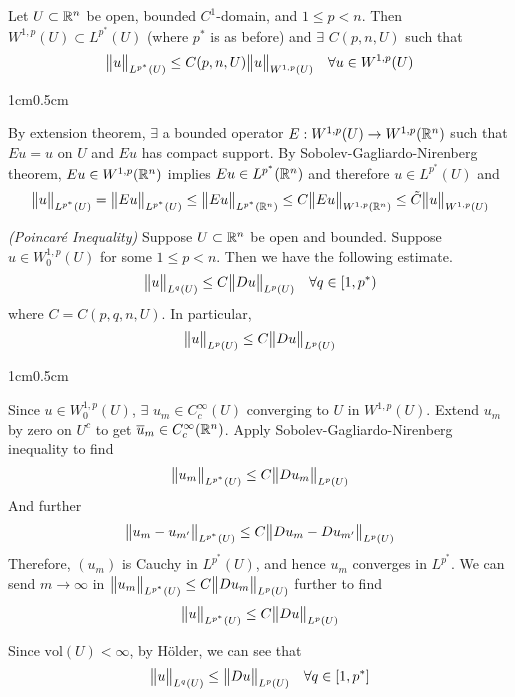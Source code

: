 \documentclass[12pt,a4paper]{report}
\newenvironment{proof}
{\begin{changemargin}{1cm}{0.5cm} 
	}%
	{\end{changemargin}
}
\begin{document}
 Let $U \subset \mathbb{R}^n$ be open, bounded $C^1$-domain, and $1\leq p<n$. Then $W^{1,p}(U) \subset L^{p^*}(U)$ (where $p^*$ is as before) and $\exists$ $C(p,n,U)$ such that
\begin{align*}
\bigl\lVert u\bigr\rVert_{L^{p^*}(U)} \leq C(p,n,U) \bigl\lVert u\bigr\rVert_{W^{1,p} (U)} \quad \forall u \in W^{1,p}(U)
\end{align*} 
\begin{proof}
\pf By extension theorem, $\exists$ a bounded operator $E: W^{1,p}(U) \rightarrow W^{1,p}(\mathbb{R}^n)$ such that $Eu = u$ on $U$ and $Eu$ has compact support. By Sobolev-Gagliardo-Nirenberg theorem, $Eu \in W^{1,p}(\mathbb{R}^n)$ implies $Eu \in L^{p^*} (\mathbb{R}^n)$ and therefore $u \in L^{p^*}(U)$ and
\begin{align*}
\bigl\lVert u\bigr\rVert_{L^{p^*}(U)} = \bigl\lVert Eu\bigr\rVert_{L^{p^*}(U)} \leq \bigl\lVert Eu\bigr\rVert_{L^{p^*}(\mathbb{R}^n)} \leq C \bigl\lVert Eu\bigr\rVert_{W^{1,p}(\mathbb{R}^n)} \leq \tilde{C}\bigl\lVert u\bigr\rVert_{W^{1,p}(U)}
\end{align*}

\eop
\end{proof}
\s

 \emph{(Poincar\'{e} Inequality)} Suppose $U\subset \mathbb{R}^n$ be open and bounded. Suppose $u \in W_0^{1,p}(U)$ for some $1\leq p<n$. Then we have the following estimate.
\begin{align*}
\bigl\lVert u\bigr\rVert_{L^q (U)} \leq C\bigl\lVert Du\bigr\rVert_{L^p(U)} \quad \forall q \in [1,p^*)
\end{align*}
where $C = C(p,q,n,U)$. In particular,
\begin{align*}
\bigl\lVert u\bigr\rVert_{L^{p}(U)} \leq C \bigl\lVert Du\bigr\rVert_{L^p(U)}
\end{align*}
\begin{proof}
\pf Since $u \in W^{1,p}_0(U)$, $\exists$ $u_m \in C_c^{\infty}(U)$ converging to $U$ in $W^{1,p}(U)$. Extend $u_m$ by zero on $U^c$ to get $\overline{u}_m \in C^{\infty}_c (\mathbb{R}^n)$. Apply Sobolev-Gagliardo-Nirenberg inequality to find
\begin{align*}
\bigl\lVert u_m\bigr\rVert_{L^{p^*}(U)} \leq C \bigl\lVert Du_m\bigr\rVert_{L^p(U)}
\end{align*}
And further
\begin{align*}
\bigl\lVert u_m - u_{m'}\bigr\rVert_{L^{p^*}(U)} \leq C \bigl\lVert Du_m - Du_{m'}\bigr\rVert_{L^p(U)}
\end{align*}
Therefore, $(u_m)$ is Cauchy in $L^{p^*}(U)$, and hence $u_m$ converges in $L^{p^*}$. We can send $m\rightarrow \infty$ in $\bigl\lVert u_m\bigr\rVert_{L^{p^*}(U)} \leq C \bigl\lVert Du_m\bigr\rVert_{L^p(U)}$ further to find
\begin{align*}
\bigl\lVert u\bigr\rVert_{L^{p^*}(U)} \leq C \bigl\lVert Du\bigr\rVert_{L^p(U)}
\end{align*}

Since $\text{vol}(U) < \infty$, by H\"{o}lder, we can see that
\begin{align*}
\bigl\lVert u\bigr\rVert_{L^q(U)} \leq \bigl\lVert Du\bigr\rVert_{L^p(U)}  \quad \forall q \in [1,p^*]
\end{align*}
\eop
\end{proof}
\s
\end{document}
